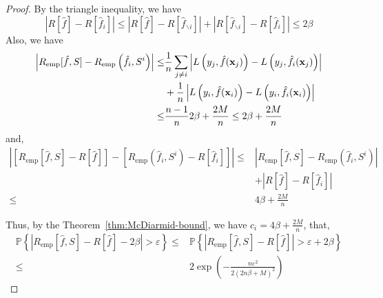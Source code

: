 \begin{proof}
	By the triangle inequality, we have
	\begin{equation}
		\left|R[\hat{f}]-R[\hat{f}_{i}]\right|\leq\left|R[\hat{f}]-R[\hat{f}_{\backslash i}]\right|+\left|R[\hat{f}_{\backslash i}]-R[\hat{f}_{i}]\right|\leq 2\beta
	\end{equation}
	Also, we have
	\begin{equation}
		\begin{aligned}
			\left|R_{\text{emp}}[\hat{f},S]-R_{\text{emp}}\left(\hat{f}_{i},S^{i}\right)\right|\leq & \frac{1}{n}\sum_{j\neq i}\left|L\left(y_{j},\hat{f}(\mathbf{x}_{j})\right)-L\left(y_{j},\hat{f}_{i}(\mathbf{x}_{j})\right)\right| \\
			                                                                                        & +\frac{1}{n}\left|L\left(y_{i},\hat{f}(\mathbf{x}_{i})\right)-L\left(y_{i},\hat{f}_{i}(\mathbf{x}_{i})\right)\right|              \\
			\leq                                                                                    & \frac{n-1}{n}2\beta+\frac{2M}{n}\leq 2\beta+\frac{2M}{n}
		\end{aligned}
	\end{equation}
	and,
	\begin{equation}
		\begin{aligned}
			\left|\left[R_{\text{emp}}[\hat{f},S]-R[\hat{f}]\right]-\left[R_{\text{emp}}\left(\hat{f}_{i},S^{i}\right)-R[\hat{f}_{i}]\right]\right|\leq & \left|R_{\text{emp}}[\hat{f},S]-R_{\text{emp}}\left(\hat{f}_{i},S^{i}\right)\right| \\
			                                                                                                                                            & +\left|R[\hat{f}]-R[\hat{f}_{i}]\right|                                             \\
			\leq                                                                                                                                        & 4\beta+\frac{2M}{n}
		\end{aligned}
	\end{equation}

	Thus, by the Theorem~\ref{thm:McDiarmid-bound}, we have \(c_{i}=4\beta+\frac{2M}{n}\), that,
	\begin{equation}
		\begin{aligned}
			\mathbb{P}\left\{|R_{\text{emp}}[\hat{f},S]-R[\hat{f}]-2\beta|>\varepsilon\right\}\leq & \mathbb{P}\left\{|R_{\text{emp}}[\hat{f},S]-R[\hat{f}]|>\varepsilon+2\beta\right\} \\
			\leq                                                                                   & 2\exp\left(-\frac{n\varepsilon^{2}}{2(2n\beta+M)^{2}}\right)
		\end{aligned}
	\end{equation}
\end{proof}

